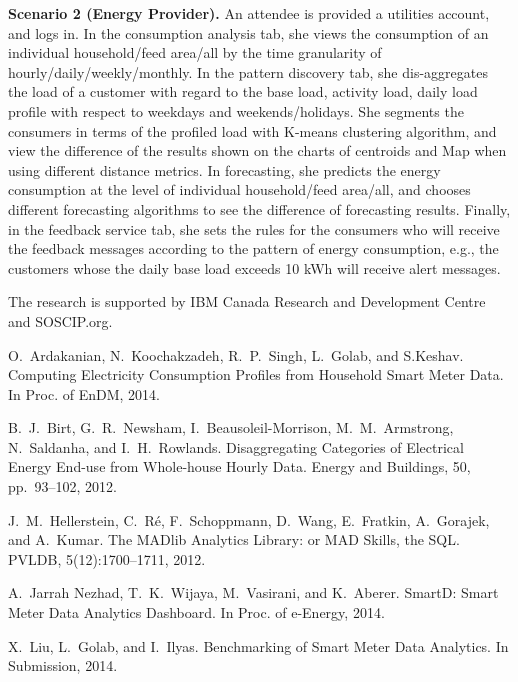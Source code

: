 \documentclass{sig-alternate}
\newcommand{\eg}{e.g.}
\begin{document}
{\bf Scenario 2 (Energy Provider).}
An attendee is provided a utilities account, and logs in. In the consumption analysis tab, she views the consumption of an individual household/feed area/all by the time granularity of hourly/daily/weekly/monthly. In the pattern discovery tab, she dis-aggreg\-ates the load of a customer with regard to the base load, activity load, daily load profile with respect to weekdays and weekends/holidays. She segments the consumers in terms of the profiled load with K-means clustering algorithm, and view the difference of the results shown on the charts of centroids and Map when using different distance metrics.  In forecasting, she predicts the energy consumption at the level of individual household/feed area/all, and chooses different forecasting algorithms to see the difference of forecasting results. Finally, in the feedback service tab, she  sets the rules for the consumers who will receive the feedback messages according to the pattern of energy consumption, \eg, the customers whose the daily base load exceeds 10 kWh will receive alert messages.
 
 The research is supported by IBM Canada Research and Development Centre and SOSCIP.org. 



\raggedright
\flushleft
\begin{thebibliography}{20}
{\small
{}
O.~Ardakanian, N.~Koochakzadeh, R.~P.~Singh, L.~Golab, and S.Keshav. Computing Electricity Consumption Profiles from Household Smart Meter Data. In Proc. of EnDM, 2014.

B.~J.~Birt, G.~R.~Newsham,  I.~Beausoleil-Morrison, M.~M.~Armstrong,  N.~Saldanha, and I.~H.~Rowlands. Disaggregating Categories of Electrical Energy End-use from Whole-house Hourly Data. Energy and Buildings, 50, pp.~93--102, 2012.

 J.~M.~Hellerstein, C.~R\'{e}, F.~Schoppmann, D.~Wang, E.~Fratkin, A.~Gorajek, and A.~Kumar. The MADlib Analytics Library: or MAD Skills, the SQL. PVLDB, 5(12):1700--1711, 2012.

A.~Jarrah Nezhad, T.~K.~Wijaya, M.~Vasirani, and K.~Aberer.  SmartD: Smart Meter Data Analytics Dashboard. In Proc. of e-Energy, 2014.

X.~Liu, L.~Golab,  and I.~Ilyas. Benchmarking of Smart Meter Data Analytics. In Submission, 2014.

}

\end{thebibliography}
\end{document}
